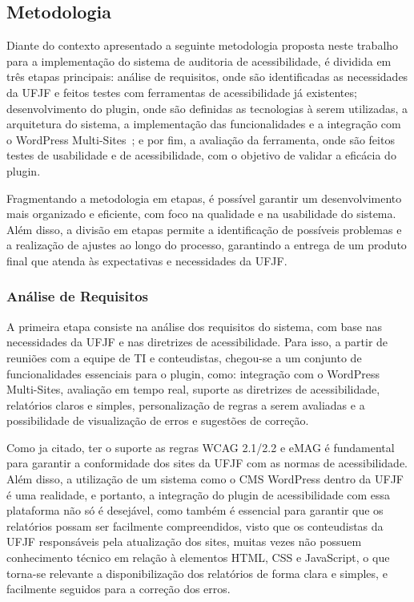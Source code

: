\documentclass[12pt]{article}
\begin{document}
\subsection{Metodologia}\label{subsec:metodologia}
Diante do contexto apresentado a seguinte metodologia proposta neste trabalho
para a implementação do sistema de auditoria de acessibilidade, é dividida
em três etapas principais: análise de requisitos, onde são identificadas as
necessidades da UFJF e feitos testes com ferramentas de acessibilidade já
existentes; desenvolvimento do plugin, onde são definidas as tecnologias à serem
utilizadas, a arquitetura do sistema, a implementação das funcionalidades e a
integração com o WordPress Multi-Sites~\autocite{wp-ms}; e por fim, a avaliação da ferramenta,
onde são feitos testes de usabilidade e de acessibilidade, com o objetivo de
validar a eficácia do plugin.

Fragmentando a metodologia em etapas, é possível garantir um desenvolvimento
mais organizado e eficiente, com foco na qualidade e na usabilidade do sistema.
Além disso, a divisão em etapas permite a identificação de possíveis problemas
e a realização de ajustes ao longo do processo, garantindo a entrega de um
produto final que atenda às expectativas e necessidades da UFJF\@.

\subsubsection{Análise de Requisitos}
A primeira etapa consiste na análise dos requisitos do sistema, com base nas
necessidades da UFJF e nas diretrizes de acessibilidade. Para isso, a partir
de reuniões com a equipe de TI e conteudistas, chegou-se a um conjunto de
funcionalidades essenciais para o plugin, como: integração com o WordPress
Multi-Sites, avaliação em tempo real, suporte as diretrizes de acessibilidade,
relatórios claros e simples, personalização de regras a serem avaliadas e a
possibilidade de visualização de erros e sugestões de correção.

Como ja citado, ter o suporte as regras WCAG 2.1/2.2 e eMAG é fundamental para
garantir a conformidade dos sites da UFJF com as normas de acessibilidade.
Além disso, a utilização de um sistema como o CMS WordPress dentro da UFJF
é uma realidade, e portanto, a integração do plugin de acessibilidade com
essa plataforma não só é desejável, como também é essencial para garantir
que os relatórios possam ser facilmente compreendidos, visto que os
conteudistas da UFJF responsáveis pela atualização dos sites, muitas
vezes não possuem conhecimento técnico em relação à elementos HTML,
CSS e JavaScript, o que torna-se relevante a disponibilização dos
relatórios de forma clara e simples, e facilmente seguidos para a
correção dos erros.
\end{document}
